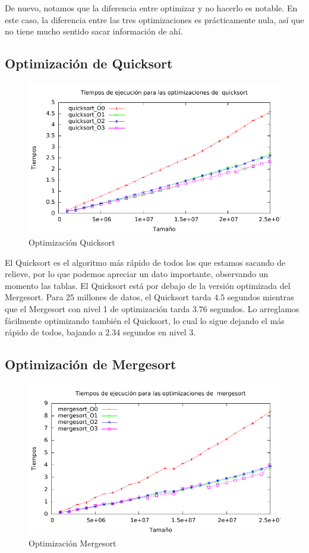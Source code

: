 \documentclass[a4paper, 11pt]{article}
\begin{document}
De nuevo, notamos que la diferencia entre optimizar y no hacerlo es notable. En este caso, la diferencia entre las tres optimizaciones es prácticamente nula, así que no tiene mucho sentido sacar información de ahí.

\newpage
\subsection{Optimización de Quicksort}

\begin{figure}[H]\includegraphics[width=12cm]{img/quicksort_optim_g.pdf} \centering
	\caption{Optimización Quicksort}\end{figure}

El Quicksort es el algoritmo más rápido de todos los que estamos sacando de relieve, por lo que podemos apreciar un dato importante, observando un momento las tablas. El Quicksort está por debajo de la versión optimizada del Mergesort. Para 25 millones de datos, el Quicksort tarda $4.5$ segundos mientras que el Mergesort con nivel 1 de optimización tarda $3.76$ segundos. Lo arreglamos fácilmente optimizando también el Quicksort, lo cual lo sigue dejando el más rápido de todos, bajando a $2.34$ segundos en nivel 3.
\newpage
\subsection{Optimización de Mergesort}

\begin{figure}[H]\includegraphics[width=13cm]{img/mergesort_optim_g.pdf} \centering
	\caption{Optimización Mergesort}\end{figure}
\end{document}
